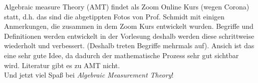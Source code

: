 Algebraic measure Theory (AMT) findet als Zoom Online Kurs (wegen Corona) statt, d.h. das sind die abgetippten Fotos von Prof. Schmidt mit einigen Anmerkungen, die zusammen in dem Zoom Kurs entwickelt wurden. Begriffe und Definitionen werden entwickelt in der Vorlesung deshalb werden diese schrittweise wiederholt und verbessert. (Deshalb treten Begriffe mehrmals auf). Ansich ist das eine sehr gute Idee, da dadurch der mathematische Prozess sehr gut sichtbar wird. Literatur gibt es zu AMT nicht.\\

Und jetzt viel Spaß bei \textit{Algebraic Measurement Theory}!